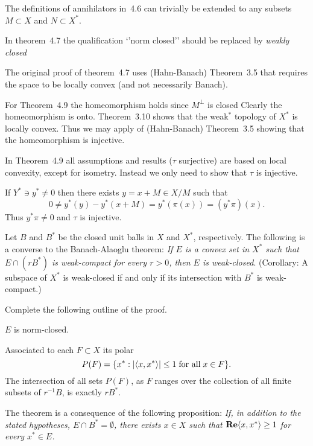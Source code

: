 \begin{enumerate}
The definitions of annihilators in~4.6 can trivially be extended
to any subsets \(M\subset X\) and \(N \subset X^*\).

In theorem~4.7 the qualification `'norm closed''
should be replaced by \emph{weakly closed}

The original proof of theorem~4.7 uses (Hahn-Banach) Theorem~3.5
that requires the space to be locally convex (and not necessarily Banach).

For Theorem~4.9 the homeomorphism holds since \(M^\perp\) is closed
Clearly the homeomorphism is onto. 
Theorem~3.10 shows that the weak\(^*\) topology of \(X^*\) is locally convex.
Thus we may apply of (Hahn-Banach) Theorem~3.5
showing that the homeomorphism is injective.

In Theorem~4.9 
all  assumptions and results (\(\tau\) surjective) 
are based on local convexity, except for isometry.
Instead we only need to show that \(\tau\) is injective.

If \(Y^*\ni y^* \neq 0\) then there exists
\(y = x+M \in X/M\) such that 
\begin{equation*}
0 \neq y^*(y) - y^*(x + M) = y^*(\pi(x)) = (y^*\pi)(x).
\end{equation*}
Thus \(y^*\pi \neq 0\) and \(\tau\) is injective.

\begin{excopy}
Let $B$ and \(B^*\) be the closed unit balls in $X$ and \(X^*\), respectively.
 The following is a
converse to the Banach-Alaoglu theorem:
\textsl{If $E$ is a convex set in \(X^*\) such that \(E \cap (rB^*)\)
is weak\upstar-compact
 for every \(r > 0\),
 then $E$ is
 weak\upstar-closed}.
 (Corollary: A subspace of \(X^*\)
is weak\upstar-closed if and only if its intersection with \(B^*\)
 is weak\upstar-compact.)

Complete the following outline of the proof.

\begin{itemize}

$E$ is norm-closed.

Associated to each \(F \subset X\) its polar
\begin{equation*}
P(F) = \{x^*: |\langle x, x^* \rangle| \leq 1 \;\textnormal{for all}\; x\in F\}.
\end{equation*}
The intersection of all sets \(P(F)\), as $F$ ranges over the collection of all
 finite subsets
of \(r^{-1}B\), is exactly \(rB^*\).

The theorem is a consequence of the following proposition:
\textsl{
 If, in addition to the
stated hypotheses, \(E \cap B^* = \emptyset\), there exists \(x \in X\)
 such that \(\mathop{\bf Re}\nolimits \langle x, x^* \rangle \geq 1\) for
every \(x^* \in E\).
}


\end{itemize}
\end{excopy}
\end{enumerate}
